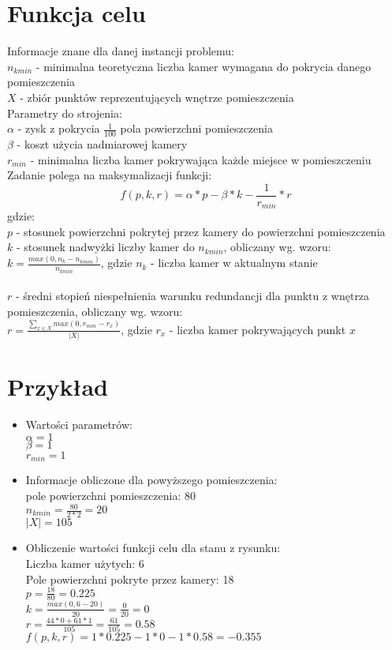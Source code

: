\documentclass[12pt,a4paper]{article}
\begin{document}
\newpage
\section{Funkcja celu}
Informacje znane dla danej instancji problemu: \\
$n_{kmin}$ - minimalna teoretyczna liczba kamer wymagana do pokrycia danego pomieszczenia \\
$X$ - zbiór punktów reprezentujących wnętrze pomieszczenia \\
%
\newline
Parametry do strojenia: \\
$\alpha$ - zysk z pokrycia $\frac{1}{100}$ pola powierzchni pomieszczenia \\
$\beta$ - koszt użycia nadmiarowej kamery \\
$r_{min}$ - minimalna liczba kamer pokrywająca każde miejsce w pomieszczeniu \\
%
\newline
Zadanie polega na maksymalizacji funkcji: \\
$$f(p, k, r) = \alpha * p - \beta * k - \frac{1}{r_{min}} * r $$ 
gdzie: \\
$p$ - stosunek powierzchni pokrytej przez kamery do powierzchni pomieszczenia \\
$k$ - stosunek nadwyżki liczby kamer do $n_{kmin}$, obliczany wg. wzoru: \\
\indent $k = \frac{max(0, n_k - n_{kmin})}{n_{kmin}}$, gdzie $n_k$ - liczba kamer w aktualnym stanie \\\\
$r$ - średni stopień niespełnienia warunku redundancji dla punktu z wnętrza pomieszczenia, obliczany wg. wzoru: \\
\indent $r = \frac{\sum_{x \in X}^{} max(0, r_{min} - r_x)}{|X|}$, gdzie $r_x$ - liczba kamer pokrywających punkt $x$

%
\section{Przykład}
\begin{itemize}
	\item Wartości parametrów:\\
	$\alpha = 1$\\
	$\beta = 1$\\
	$r_{min} = 1$
	\item Informacje obliczone dla powyższego pomieszczenia:\\
	pole powierzchni pomieszczenia: 80\\
	$n_{kmin} = \frac{80}{2*2} = 20$\\
	$|X| = 105$
	\item Obliczenie wartości funkcji celu dla stanu z rysunku:\\
	Liczba kamer użytych: 6\\
	Pole powierzchni pokryte przez kamery: 18\\
	$p = \frac{18}{80} = 0.225$\\
	$k = \frac{max(0, 6-20)}{20} = \frac{0}{20} = 0$\\
	$r = \frac{44*0 + 61*1}{105} = \frac{61}{105} = 0.58$\\
	$f(p, k, r) = 1*0.225 - 1*0 - 1*0.58 = -0.355$
\end{itemize}
\end{document}
